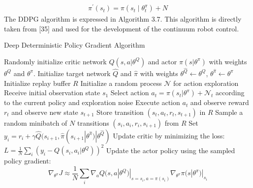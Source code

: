 \documentclass[12pt,twoside,a4]{mwbk}
\begin{document}
\begin{subequations}
\begin{align}
    \pi^{\prime}\left(s_{t}\right)=\pi\left(s_{t} \mid \theta_{t}^{\pi}\right)+N
\end{align}
\end{subequations}
The DDPG algorithm is expressed in Algorithm 3.7. This algorithm is directly taken from [35] and used for the development of the continuum robot control.
\newpage
\begin{algorithm}
\caption{Deep Deterministic Policy Gradient Algorithm}
\begin{algorithmic}[1]
\State Randomly initialize critic network $Q(s, a | \theta^Q)$ and actor $\pi(s | \theta^{\pi})$ with weights $\theta^{Q}$ and $\theta^{\pi}$.
\State Initialize target network $\hat{Q}$ and $\hat{\pi}$ with weights $\theta^{\hat{Q}} \leftarrow \theta^{Q}$, $\theta^{\hat{\pi}} \leftarrow \theta^{\pi}$
\State Initialize replay buffer $R$
        \State Initialize a random process $\mathcal{N}$ for action exploration
        \State Receive initial observation state $s_1$
                \State Select action $a_t = \pi(s_t | \theta^{\pi}) + \mathcal{N}_t$ according to the current policy and exploration noise
                \State Execute action $a_t$ and observe reward $r_t$ and observe new state $s_{t+1}$
                \State Store transition $(s_t, a_t, r_t, s_{t+1})$ in $R$
                \State Sample a random minibatch of $N$ transitions $(s_i, a_i, r_i, s_{i + 1})$ from $R$
                \State Set $ y_i = r_i + \gamma \hat{Q}(s_{i + 1}, \hat{\pi}(s_{i+1} | \theta^{\hat{\pi}}) | \theta^{\hat{Q}}) $
                \State Update critic by minimizing the loss: $L = \frac{1}{N} \sum_i (y_i - Q(s_i, a_i | \theta^Q))^2$
                \State Update the actor policy using the sampled policy gradient:
                \begin{equation*}
                \nabla_{\theta^{\pi}} J \approx \frac{1}{N} \sum_i \nabla_{a} Q(s, a | \theta^Q)|_{s = s_i, a = \pi(s_i)} \nabla_{\theta^\pi} \pi(s | \theta^\pi)|_{s_i}

\end{equation*}
\end{algorithmic}
\end{algorithm}
\end{document}
